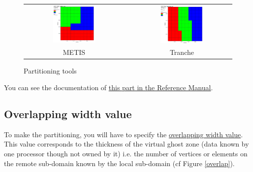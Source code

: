 \begin{figure}[h!]
\begin{centering}
\begin{tabular}{ccc}
\includegraphics[width=0.45\textwidth]{partition_metis.jpeg} & & \includegraphics[width=0.45\textwidth]{partition_tranche.jpeg}\tabularnewline
METIS & & Tranche\tabularnewline
\end{tabular}
\par\end{centering}
\caption{Partitioning tools}
\label{partitioning}
\end{figure}

You can see the documentation of \href{\REFERENCEMANUAL\#partition}{this part in the \trustref Reference Manual}.



\subsection{Overlapping width value}
To make the partitioning, you will have to specify the \underline{overlapping width value}.
This value corresponds to the thickness of the virtual ghost zone (data known by one processor though not owned by it) i.e. the number of vertices or elements on the remote sub-domain known by the local sub-domain (cf Figure \ref{overlap}).

